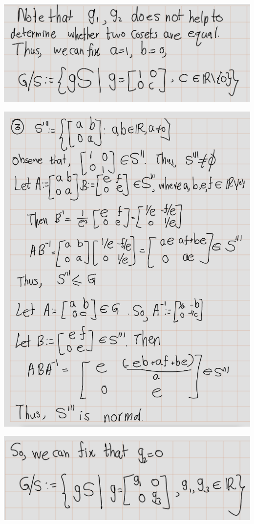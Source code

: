 \documentclass[
]{book}
\begin{document}
\includegraphics{figures/ch_2/fig44.png}

\includegraphics{figures/ch_2/fig45.png}

\includegraphics{figures/ch_2/fig46.png}
\end{document}

